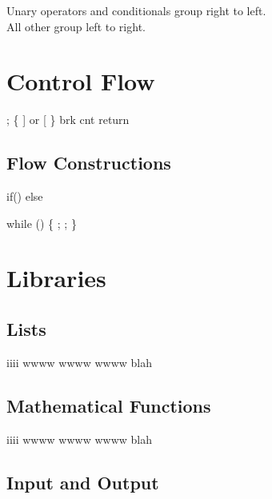 \documentclass{refcard}
\begin{document}
\noindent
Unary operators and conditionals group right to left.\\
All other group left to right.


\section{Control Flow}

\begin{ldesc}
	        ;
	             \{ ] or [ \}
	             brk
	        cnt
	  return 
\end{ldesc}


\subsection{Flow Constructions}

\begin{ldesc}
	\li[if statement]
		if\s()\s{}     \li
		else\s\s\s\s\s\s\s\s{} \li

		while () \{           \li
		\s\s\s\s{};        \li
		\s\s\s\s{};        \li
	    \}
\end{ldesc}


\section{Libraries}


\subsection{Lists \hfill {}}

\begin{ldesc}
	\li[iiii] iiii
	\li[wwww] wwww
	\li[iiii] wwww
	\li       wwww
	\li[blah] blah
\end{ldesc}

\subsection{Mathematical Functions \hfill {}}

\begin{ldesc}
	\li[iiii] iiii
	\li[wwww] wwww
	\li[iiii] wwww
	\li       wwww
	\li[blah] blah
\end{ldesc}


\subsection{Input and Output \hfill {}}
\end{document}
